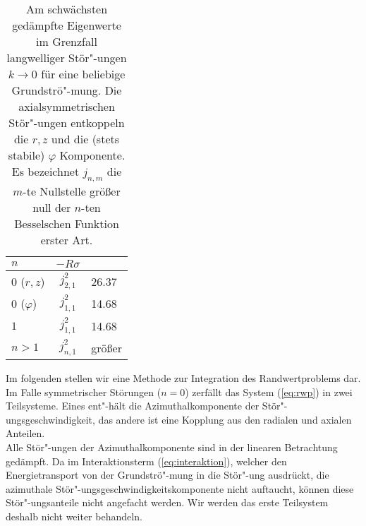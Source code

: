 \documentclass[10pt,a5paper,oneside,draft]{book}
\numberwithin{equation}{chapter}
\begin{document}
\begin{table}[htbp]	%
	\begin{center}
	\caption{\label{tab:start}Am schw\"achsten ged\"ampfte Eigenwerte im Grenzfall langwelliger St\"or"-ungen $k\to0$ f\"ur eine beliebige Grundstr\"o"-mung.  Die axialsymmetrischen St\"or"-ungen entkoppeln die $r,z$ und die (stets stabile) $\varphi$ Komponente.
	Es bezeichnet $j_{n,m}$ die $m$-te Nullstelle gr\"o\ss er null der $n$-ten Besselschen Funktion erster Art.}
	\begin{tabular}{l|cl}
        $n$     & $-R\sigma$ & \\\hline
        $0$ ($r,z$)     & $j_{2,1}^2$ & 26.37\\
        $0$ ($\varphi$) & $j_{1,1}^2$ & 14.68\\
        $1$     & $j_{1,1}^2$ & 14.68\\
        $n>1$   & $j_{n,1}^2$ & gr\"o\ss er\\
	\end{tabular}
	\end{center}
\end{table}

Im folgenden stellen wir eine Methode zur Integration des Randwertproblems dar.\\
Im Falle symmetrischer St\"orungen ($n=0$) zerf\"allt das System (\mbox{\ref{eq:rwp}}) in zwei Teilsysteme.
Eines ent"-h\"alt die Azimuthalkomponente der St\"or"-ungsgeschwindigkeit, das andere ist eine Kopplung aus den radialen und axialen Anteilen.\\
Alle St\"or"-ungen der Azimuthalkomponente sind in der linearen Betrachtung ged\"ampft.
Da im Interaktionsterm (\mbox{\ref{eq:interaktion}}), welcher den Energietransport von der Grundstr\"o"-mung in die St\"or"-ung ausdr\"uckt, die azimuthale St\"or"-ungsgeschwindigkeitskomponente nicht auftaucht, k\"onnen diese St\"or"-ungsanteile nicht angefacht werden.
Wir werden das erste Teilsystem deshalb nicht weiter behandeln.\\
\end{document}
